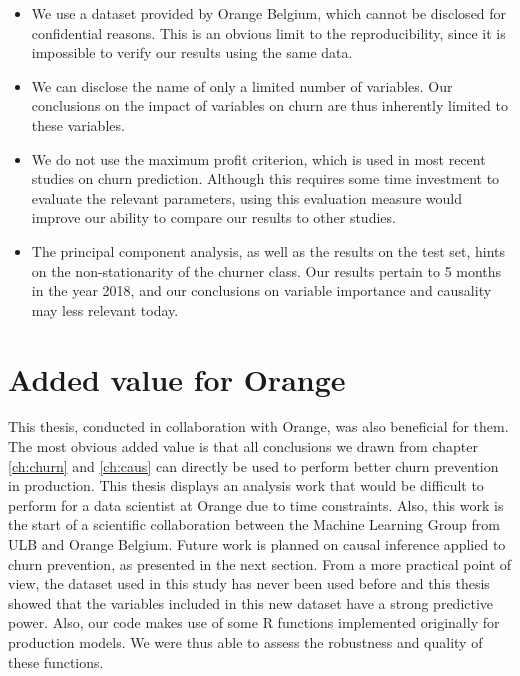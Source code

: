 \begin{itemize}
	\item We use a dataset provided by Orange Belgium, which cannot be disclosed
	for confidential reasons. This is an obvious limit to the reproducibility,
	since it is impossible to verify our results using the same data.

	\item We can disclose the name of only a limited number of variables. Our
	conclusions on the impact of variables on churn are thus inherently limited
	to these variables.

	\item We do not use the maximum profit criterion, which is used in most
	recent studies on churn prediction. Although this requires some time
	investment to evaluate the relevant parameters, using this evaluation
	measure would improve our ability to compare our results to other studies.

	\item The principal component analysis, as well as the results on the test
	set, hints on the non-stationarity of the churner class. Our results pertain
	to 5 months in the year 2018, and our conclusions on variable importance and
	causality may less relevant today.

\end{itemize}

\section{Added value for Orange}

This thesis, conducted in collaboration with Orange, was also beneficial for
them. The most obvious added value is that all conclusions we drawn from chapter
\ref{ch:churn} and \ref{ch:caus} can directly be used to perform better churn
prevention in production. This thesis displays an analysis work that would be
difficult to perform for a data scientist at Orange due to time constraints.
Also, this work is the start of a scientific collaboration between the Machine
Learning Group from ULB and Orange Belgium. Future work is planned on causal
inference applied to churn prevention, as presented in the next section. From a
more practical point of view, the dataset used in this study has never been used
before and this thesis showed that the variables included in this new dataset
have a strong predictive power. Also, our code makes use of some R functions
implemented originally for production models. We were thus able to assess the
robustness and quality of these functions.

